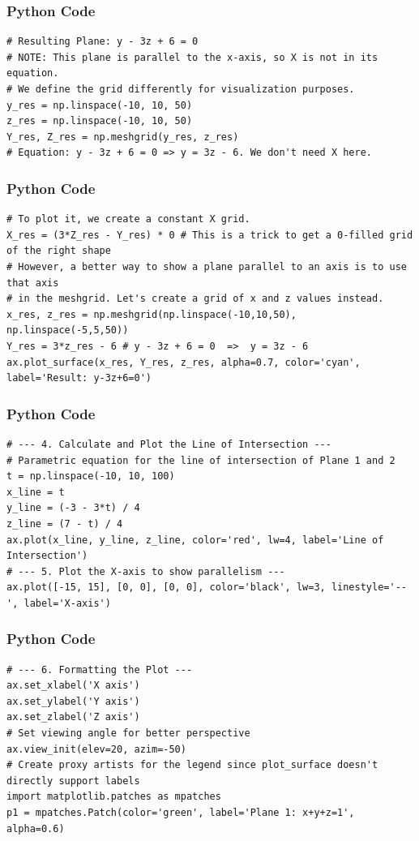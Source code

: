\documentclass{beamer}
\begin{document}
\begin{frame}[fragile]
\frametitle{Python Code}
\begin{lstlisting}
# Resulting Plane: y - 3z + 6 = 0
# NOTE: This plane is parallel to the x-axis, so X is not in its equation.
# We define the grid differently for visualization purposes.
y_res = np.linspace(-10, 10, 50)
z_res = np.linspace(-10, 10, 50)
Y_res, Z_res = np.meshgrid(y_res, z_res)
# Equation: y - 3z + 6 = 0 => y = 3z - 6. We don't need X here.
\end{lstlisting}
\end{frame}

\begin{frame}[fragile]
\frametitle{Python Code}
\begin{lstlisting}
# To plot it, we create a constant X grid.
X_res = (3*Z_res - Y_res) * 0 # This is a trick to get a 0-filled grid of the right shape
# However, a better way to show a plane parallel to an axis is to use that axis
# in the meshgrid. Let's create a grid of x and z values instead.
x_res, z_res = np.meshgrid(np.linspace(-10,10,50), np.linspace(-5,5,50))
Y_res = 3*z_res - 6 # y - 3z + 6 = 0  =>  y = 3z - 6
ax.plot_surface(x_res, Y_res, z_res, alpha=0.7, color='cyan', label='Result: y-3z+6=0')
\end{lstlisting}
\end{frame}

\begin{frame}[fragile]
\frametitle{Python Code}
\begin{lstlisting}
# --- 4. Calculate and Plot the Line of Intersection ---
# Parametric equation for the line of intersection of Plane 1 and 2
t = np.linspace(-10, 10, 100)
x_line = t
y_line = (-3 - 3*t) / 4
z_line = (7 - t) / 4
ax.plot(x_line, y_line, z_line, color='red', lw=4, label='Line of Intersection')
# --- 5. Plot the X-axis to show parallelism ---
ax.plot([-15, 15], [0, 0], [0, 0], color='black', lw=3, linestyle='--', label='X-axis')
\end{lstlisting}
\end{frame}

\begin{frame}[fragile]
\frametitle{Python Code}
\begin{lstlisting}
# --- 6. Formatting the Plot ---
ax.set_xlabel('X axis')
ax.set_ylabel('Y axis')
ax.set_zlabel('Z axis')
# Set viewing angle for better perspective
ax.view_init(elev=20, azim=-50)
# Create proxy artists for the legend since plot_surface doesn't directly support labels
import matplotlib.patches as mpatches
p1 = mpatches.Patch(color='green', label='Plane 1: x+y+z=1', alpha=0.6)
\end{lstlisting}
\end{frame}
\end{document}
